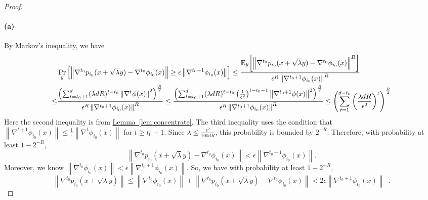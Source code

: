 \documentclass[12pt]{article}
\newcommand{\lem}[1]{\hyperref[lem:#1]{Lemma~\ref*{lem:#1}}}
\newcommand{\grad}[2]{\nabla^{#1}{#2}}
\newcommand{\br}[1]{\left(#1\right)} \newcommand{\Br}[1]{\left[#1\right]} \newcommand{\st}[1]{\left\{#1\right\}} \newcommand{\tr}[1]{\mathrm{Tr}\!\Br{#1}} \newcommand{\abs}[1]{\left|#1 \right|} \newcommand{\norm}[1]{\left\lVert #1 \right\rVert} \newcommand{\agl}[2]{\theta^{\br{#1}}_{#2}} \newcommand{\aglp}[2]{{\theta'}^{\br{#1}}_{#2}} \newcommand{\lint}[1]{\left\lfloor#1\right\rfloor} \newcommand{\poly}[1]{\mathrm{poly}\!\br{#1}} \newcommand{\negl}[1]{\mathrm{negl}\!\br{#1}} \newcommand{\de}[1]{\mathrm{d}#1} \newcommand{\val}[1]{\mathrm{val}\!\br{#1}} \newcommand{\vall}[1]{\mathrm{val}\br{#1}} \newcommand{\nd}[1]{\mathcal{N}\!\br{#1}} \newcommand{\ketbratwo}[2]{\ket{#1} \hspace{-0.4em}\bra{#2}} \newcommand{\ketbra}[1]{\ketbratwo{#1}{#1}} \newcommand{\id}{\ensuremath{\mathds{1}}} \newcommand{\ogroup}[1]{\mathrm{O}\!\br{#1}} \newcommand{\ugroup}[1]{\mathrm{U}\!\br{#1}} \newcommand{\td}{\mathrm{TD}} \newcommand{\tv}[1]{\norm{#1}_{\mathrm{TV}}} \newcommand {\defeq} {\ensuremath{ \stackrel{\mathrm{def}}{=} }} \newcommand{\vdim}{\ensuremath{N}} \newcommand{\dimin}{\ensuremath{n}} \newcommand{\dimout}{\ensuremath{m}} \newcommand{\ncopy}{\ell} \newcommand{\hspacein}{\H_\mathrm{in}} \newcommand{\hspaceout}{\H_\mathrm{out}} \newcommand{\Sin}{\S(\hspacein)} \newcommand{\Sout}{\S(\hspaceout)} \newcommand{\haar}{\ensuremath{\mu}} \newcommand{\tensorhaar}{\ensuremath{\eta}} \newcommand{\tensorsrss}{\ensuremath{\nu}} \newcommand{\qadvice}{\ensuremath{\rho}} \newcommand{\tp}{\otimes} \newcommand{\wone}[2]{W_1\!\br{#1,#2}}
\begin{document}
\begin{proof}
	\paragraph{(a)}
	By Markov's inequality, we have
	\begin{align*}
		&\Pr_y\Br{\norm{ \grad{t_0}{p_{i_0}(x+\sqrt{\lambda}y)} - \grad{t_0}{\phi_{i_0}(x)}} \geq \epsilon\norm{ \grad{t_0+1}{\phi_{i_0}(x)}} }
		\leq \frac{\expect{y}{\norm{ \grad{t_0}{p_{i_0}(x+\sqrt{\lambda}y)} - \grad{t_0}{\phi_{i_0}(x)}}^R}}{\epsilon^R\norm{ \grad{t_0+1}{\phi_{i_0}(x)}}^R} \\
		\leq &\frac{\br{ \sum_{t=t_0+1}^d (\lambda d R)^{t-t_0} \norm{ \grad{t}{\phi(x)}}^2 }^{\frac{R}{2}} }{\epsilon^R\norm{ \grad{t_0+1}{\phi_{i_0}(x)}}^R} 
		\leq \frac{\br{ \sum_{t=t_0+1}^d (\lambda d R)^{t-t_0} \br{\frac{1}{\epsilon^2}}^{t-t_0-1} \norm{ \grad{t_0+1}{\phi(x)}}^2 }^{\frac{R}{2}} }{\epsilon^R\norm{ \grad{t_0+1}{\phi_{i_0}(x)}}^R} 
		\leq \br{\sum_{t=1}^{d-t_0} \br{\frac{\lambda d R}{\epsilon^2}}^{t}}^{\frac{R}{2}}
	\end{align*}
	Here the second inequality is from \lem{concentrate}.
	The third inequality uses the condition that $ \norm{\grad{t+1}{\phi_{i_0}(x)}} \leq \frac{1}{\epsilon}\norm{\grad{t}{\phi_{i_0}(x)}} $ for $t\geq t_0+1$.
	Since $\lambda\leq \frac{\epsilon^2}{100dR}$, this probability is bounded by $2^{-R}$. Therefore, with probability at least $1-2^{-R}$,
	\[
		\norm{ \grad{t_0}{p_{i_0}(x+\sqrt{\lambda}y)} - \grad{t_0}{\phi_{i_0}(x)}} < \epsilon\norm{ \grad{t_0+1}{\phi_{i_0}(x)}}.
	\]
	Moreover, we know $ \norm{\grad{t_0}{\phi_{i_0}(x)}} < {\epsilon}\norm{\grad{t_0+1}{\phi_{i_0}(x)}} $.
	So, we have with probability at least $1-2^{-R}$,
	\[
	\norm{ \grad{t_0}{p_{i_0}(x+\sqrt{\lambda}y)}}\leq
	\norm{ \grad{t_0}{\phi_{i_0}(x)}} +
	\norm{ \grad{t_0}{p_{i_0}(x+\sqrt{\lambda}y)} - \grad{t_0}{\phi_{i_0}(x)}} < 2\epsilon\norm{ \grad{t_0+1}{\phi_{i_0}(x)}}\enspace .
	\]
	

\end{proof}
\end{document}
